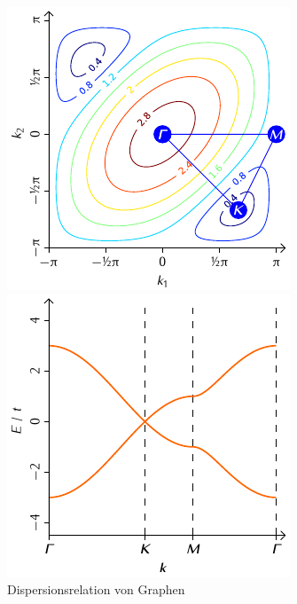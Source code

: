 \documentclass[a4paper, 10pt, twoside, openany]{book} %
\begin{document}
	\begin{figure}
		\begin{minipage}[t]{0.48\textwidth}
			\includegraphics[width=\textwidth]{Abbildungen/Bandstrukturen/BZ_C2_1.pdf}
		\end{minipage}
		\hfill
		\begin{minipage}[t]{0.48\textwidth}
			\includegraphics[width=\textwidth]{Abbildungen/Bandstrukturen/C2.pdf}
		\end{minipage}
		\caption{Dispersionsrelation von Graphen}
		\label{C2}
	\end{figure}
\end{document}
